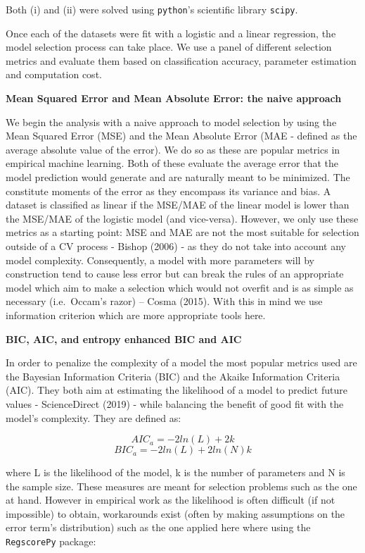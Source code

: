 \documentclass[]{article}
\begin{document}
Both (i) and (ii) were solved using \texttt{python}'s scientific library
\texttt{scipy}.

Once each of the datasets were fit with a logistic and a linear
regression, the model selection process can take place. We use a panel
of different selection metrics and evaluate them based on classification
accuracy, parameter estimation and computation cost.

\textbf{Mean Squared Error and Mean Absolute Error: the naive approach}

We begin the analysis with a naive approach to model selection by using
the Mean Squared Error (MSE) and the Mean Absolute Error (MAE - defined
as the average absolute value of the error). We do so as these are
popular metrics in empirical machine learning. Both of these evaluate
the average error that the model prediction would generate and are
naturally meant to be minimized. The constitute moments of the error as
they encompass its variance and bias. A dataset is classified as linear
if the MSE/MAE of the linear model is lower than the MSE/MAE of the
logistic model (and vice-versa). However, we only use these metrics as a
starting point: MSE and MAE are not the most suitable for selection
outside of a CV process - Bishop (2006) - as they do not take into
account any model complexity. Consequently, a model with more parameters
will by construction tend to cause less error but can break the rules of
an appropriate model which aim to make a selection which would not
overfit and is as simple as necessary (i.e.~Occam's razor) -- Cosma
(2015). With this in mind we use information criterion which are more
appropriate tools here.

\textbf{BIC, AIC, and entropy enhanced BIC and AIC}

In order to penalize the complexity of a model the most popular metrics
used are the Bayesian Information Criteria (BIC) and the Akaike
Information Criteria (AIC). They both aim at estimating the likelihood
of a model to predict future values - ScienceDirect (2019) - while
balancing the benefit of good fit with the model's complexity. They are
defined as:

\[AIC_a = -2ln(L) + 2k\] \[BIC_a = -2ln(L) + 2ln(N)k\]

where L is the likelihood of the model, k is the number of parameters
and N is the sample size. These measures are meant for selection
problems such as the one at hand. However in empirical work as the
likelihood is often difficult (if not impossible) to obtain, workarounds
exist (often by making assumptions on the error term's distribution)
such as the one applied here where using the \texttt{RegscorePy}
package:
\end{document}
